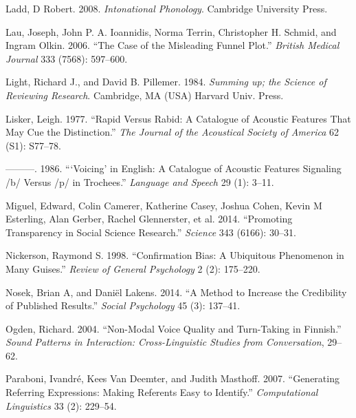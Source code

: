 \documentclass[
  12pt,
]{article}
\newlength{\cslhangindent}
\newenvironment{CSLReferences}[2] %
 {%
  \setlength{\parindent}{0pt}
  \ifodd #1 \everypar{\setlength{\hangindent}{\cslhangindent}}\ignorespaces\fi
  \ifnum #2 > 0
  \setlength{\parskip}{#2\baselineskip}
  \fi
 }%
 {}
\begin{document}
\begin{CSLReferences}{1}{0}
\leavevmode{}%
Ladd, D Robert. 2008. \emph{Intonational Phonology}. Cambridge University Press.

\leavevmode{}%
Lau, Joseph, John P. A. Ioannidis, Norma Terrin, Christopher H. Schmid, and Ingram Olkin. 2006. {``The Case of the Misleading Funnel Plot.''} \emph{British Medical Journal} 333 (7568): 597--600.

\leavevmode{}%
Light, Richard J., and David B. Pillemer. 1984. \emph{Summing up; the Science of Reviewing Research}. Cambridge, MA (USA) Harvard Univ. Press.

\leavevmode{}%
Lisker, Leigh. 1977. {``Rapid Versus Rabid: A Catalogue of Acoustic Features That May Cue the Distinction.''} \emph{The Journal of the Acoustical Society of America} 62 (S1): S77--78.

\leavevmode{}%
---------. 1986. {``{`Voicing'} in {E}nglish: A Catalogue of Acoustic Features Signaling /b/ Versus /p/ in Trochees.''} \emph{Language and Speech} 29 (1): 3--11.

\leavevmode{}%
Miguel, Edward, Colin Camerer, Katherine Casey, Joshua Cohen, Kevin M Esterling, Alan Gerber, Rachel Glennerster, et al. 2014. {``Promoting Transparency in Social Science Research.''} \emph{Science} 343 (6166): 30--31.

\leavevmode{}%
Nickerson, Raymond S. 1998. {``Confirmation Bias: A Ubiquitous Phenomenon in Many Guises.''} \emph{Review of General Psychology} 2 (2): 175--220.

\leavevmode{}%
Nosek, Brian A, and Daniël Lakens. 2014. {``A Method to Increase the Credibility of Published Results.''} \emph{Social Psychology} 45 (3): 137--41.

\leavevmode{}%
Ogden, Richard. 2004. {``Non-Modal Voice Quality and Turn-Taking in {F}innish.''} \emph{Sound Patterns in Interaction: Cross-Linguistic Studies from Conversation}, 29--62.

\leavevmode{}%
Paraboni, Ivandré, Kees Van Deemter, and Judith Masthoff. 2007. {``Generating Referring Expressions: Making Referents Easy to Identify.''} \emph{Computational Linguistics} 33 (2): 229--54.


\end{CSLReferences}
\end{document}
